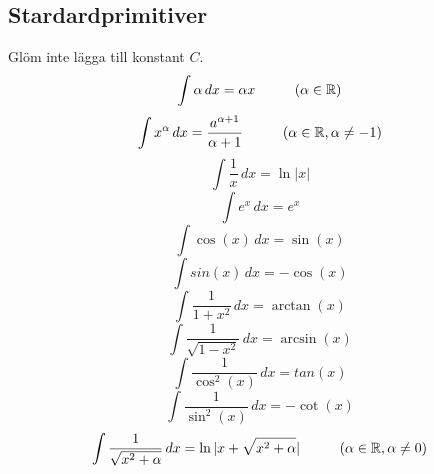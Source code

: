 \documentclass[10pt,a4paper]{article}
\begin{document}
\subsection{Stardardprimitiver}
Glöm inte lägga till konstant $C$.
\begin{equation}
\int \alpha \,dx = \alpha x \hspace{10mm}(\alpha\in\mathbb{R})
\end{equation}
\begin{equation}
\int x^\alpha \,dx = \frac{a^{\alpha+1}}{\alpha+1} \hspace{10mm}(\alpha\in\mathbb{R},\alpha\neq-1)
\end{equation}
\begin{equation}
\int \frac{1}{x} \,dx = \ln|x|
\end{equation}
\begin{equation}
\int e^x \,dx = e^x
\end{equation}
\begin{equation}
\int \cos(x) \,dx = \sin(x)
\end{equation}
\begin{equation}
\int sin(x) \,dx = -\cos(x)
\end{equation}
\begin{equation}
\int \frac{1}{1+x^2} \,dx = \arctan(x)
\end{equation}
\begin{equation}
\int \frac{1}{\sqrt{1-x^2}} \,dx = \arcsin(x)
\end{equation}
\begin{equation}
\int \frac{1}{\cos^2(x)} \,dx = tan(x)
\end{equation}
\begin{equation}
\int \frac{1}{\sin^2(x)} \,dx = -\cot(x)
\end{equation}
\begin{equation}
\int \frac{1}{\sqrt{x^2+\alpha}} \,dx = \ln|x+\sqrt{x^2+\alpha}| \hspace{10mm} (\alpha
\in \mathbb{R},\alpha\neq0)
\end{equation}
\end{document}
